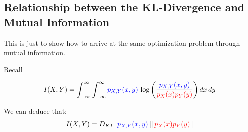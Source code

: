 \newpage

\subsection{Relationship between the KL-Divergence and Mutual Information}

\begin{frame}{\subsecname}


This is just to show how to arrive at the same optimization problem through mutual information.

Recall

\begin{equation*}
I(X,Y) = \int_{-\infty}^{\infty} \int_{-\infty}^{\infty} {\color{blue}p_{X,Y}(x,y)} \, \log \left(\frac{{\color{blue}p_{X,Y}(x,y)}}{{\color{red}p_X(x) p_Y(y)}}\right) dx \, dy
\end{equation*}



\pause

We can deduce that:
\begin{equation}
I(X,Y) = D_{KL} \lbrack \, {\color{blue}p_{X,Y}(x,y)} \, || \, {\color{red}p_X(x) p_Y(y)} \, \rbrack
\end{equation}

\end{frame}

